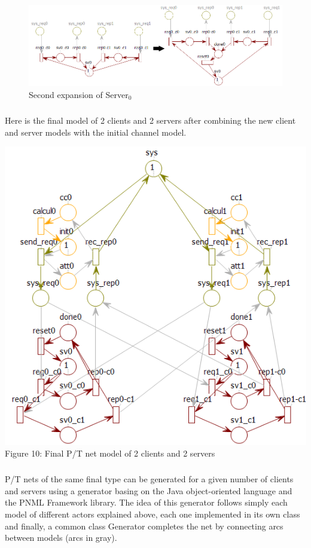 \documentclass{article}
\begin{document}
	\begin{figure}[h]
		\centering
		\hspace*{-60pt}
		\includegraphics[scale=0.75]{Server2}
		\caption{Second expansion of Server$_0$}
	\end{figure}
\newpage
	\subparagraph{}Here is the final model of 2 clients and 2 servers after combining the new client and server models with the initial channel model.
	\begin{center}
		\centering
		\includegraphics[scale=0.7]{cli2sv2}
		\vspace*{10pt}
		\\Figure 10: Final P/T net model of 2 clients and 2 servers
	\end{center}
	\subparagraph{}P/T nets of the same final type can be generated for a given number of clients and servers using a generator basing on the Java object-oriented language and the PNML Framework library. The idea of this generator follows simply each model of different actors explained above, each one implemented in its own class and finally, a common class Generator completes the net by connecting arcs between models (arcs in gray).
\end{document}
